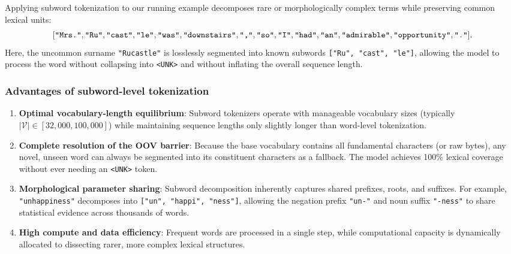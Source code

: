 \documentclass[../../../main.tex]{subfiles}
\begin{document}
Applying subword tokenization to our running example decomposes rare or morphologically complex terms while preserving common lexical units:
\begin{equation}
\label{eq:subword_token_example}
[\text{\texttt{"Mrs."}}, \text{\texttt{"Ru"}}, \text{\texttt{"cast"}}, \text{\texttt{"le"}}, \text{\texttt{"was"}}, \text{\texttt{"downstairs"}}, \text{\texttt{","}}, \text{\texttt{"so"}}, \text{\texttt{"I"}}, \text{\texttt{"had"}}, \text{\texttt{"an"}}, \text{\texttt{"admirable"}}, \text{\texttt{"opportunity"}}, \text{\texttt{"."}}].
\end{equation}
Here, the uncommon surname \texttt{"Rucastle"} is losslessly segmented into known subwords \texttt{["Ru", "cast", "le"]}, allowing the model to process the word without collapsing into \texttt{<UNK>} and without inflating the overall sequence length.

\subsubsection{Advantages of subword-level tokenization}
\begin{enumerate}
    \item \textbf{Optimal vocabulary-length equilibrium}: Subword tokenizers operate with manageable vocabulary sizes (typically $|\mathcal{V}| \in [32{,}000, 100{,}000]$) while maintaining sequence lengths only slightly longer than word-level tokenization.
    \item \textbf{Complete resolution of the OOV barrier}: Because the base vocabulary contains all fundamental characters (or raw bytes), any novel, unseen word can always be segmented into its constituent characters as a fallback. The model achieves 100\% lexical coverage without ever needing an \texttt{<UNK>} token.
    \item \textbf{Morphological parameter sharing}: Subword decomposition inherently captures shared prefixes, roots, and suffixes. For example, \texttt{"unhappiness"} decomposes into \texttt{["un", "happi", "ness"]}, allowing the negation prefix \texttt{"un-"} and noun suffix \texttt{"-ness"} to share statistical evidence across thousands of words.
    \item \textbf{High compute and data efficiency}: Frequent words are processed in a single step, while computational capacity is dynamically allocated to dissecting rarer, more complex lexical structures.
\end{enumerate}
\end{document}
